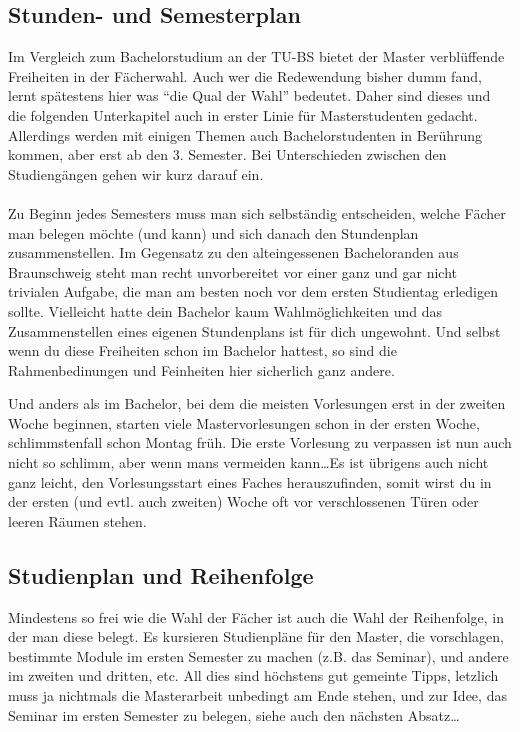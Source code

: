 \subsection{Stunden- und Semesterplan}
 
Im Vergleich zum Bachelorstudium an der TU-BS bietet der Master
verblüffende Freiheiten in der Fächerwahl. Auch wer die Redewendung
bisher dumm fand, lernt spätestens hier was "`die Qual der Wahl"'
bedeutet. Daher sind dieses und die folgenden Unterkapitel auch in erster
Linie für Masterstudenten gedacht. Allerdings werden mit einigen
Themen auch Bachelorstudenten in Berührung kommen, aber erst ab den
3. Semester. Bei Unterschieden zwischen den Studiengängen gehen wir
kurz darauf ein.\\\\
Zu Beginn jedes Semesters muss man sich selbständig entscheiden, welche Fächer man belegen möchte (und kann) und sich danach den Stundenplan zusammenstellen. Im Gegensatz zu den alteingessenen Bacheloranden aus Braunschweig steht man recht unvorbereitet vor einer ganz und gar nicht trivialen Aufgabe, die man am besten noch vor dem ersten Studientag erledigen sollte. Vielleicht hatte dein Bachelor kaum Wahlmöglichkeiten und das Zusammenstellen eines eigenen Stundenplans ist für dich ungewohnt. Und selbst wenn du diese Freiheiten schon im Bachelor hattest, so sind die Rahmenbedinungen und Feinheiten hier sicherlich ganz andere.

Und anders als im Bachelor, bei dem die meisten Vorlesungen erst in der zweiten Woche beginnen, starten viele Mastervorlesungen schon in der ersten Woche, schlimmstenfall schon Montag früh. Die erste Vorlesung zu verpassen ist nun auch nicht so schlimm, aber wenn mans vermeiden kann\ldots Es ist übrigens auch nicht ganz leicht, den Vorlesungsstart eines Faches herauszufinden, somit wirst du in der ersten (und evtl. auch zweiten) Woche oft vor verschlossenen Türen oder leeren Räumen stehen.







\subsection{Studienplan und Reihenfolge}
Mindestens so frei wie die Wahl der Fächer ist auch die Wahl der Reihenfolge, in der man diese belegt. Es kursieren Studienpläne für den Master, die vorschlagen, bestimmte Module im ersten Semester zu machen (z.B. das Seminar), und andere im zweiten und dritten, etc. All dies sind höchstens gut gemeinte Tipps, letzlich muss ja nichtmals die Masterarbeit unbedingt am Ende stehen, und zur Idee, das Seminar im ersten Semester zu belegen, siehe auch den nächsten Absatz\ldots
          



